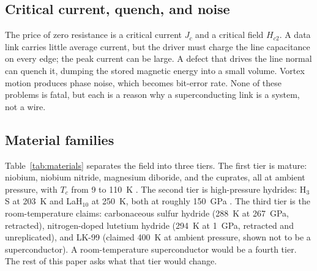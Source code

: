 \documentclass[10pt,letterpaper]{article}
\begin{document}
\subsection{Critical current, quench, and noise}

The price of zero resistance is a critical current $J_c$ and a critical field $H_{c2}$. A data link carries little average current, but the driver must charge the line capacitance on every edge; the peak current can be large. A defect that drives the line normal can quench it, dumping the stored magnetic energy into a small volume. Vortex motion produces phase noise, which becomes bit-error rate. None of these problems is fatal, but each is a reason why a superconducting link is a system, not a wire.

\subsection{Material families}

Table~\ref{tab:materials} separates the field into three tiers. The first tier is mature: niobium, niobium nitride, magnesium diboride, and the cuprates, all at ambient pressure, with $T_c$ from 9 to 110~K \cite{bednorz,wu}. The second tier is high-pressure hydrides: H$_3$S at 203~K and LaH$_{10}$ at 250~K, both at roughly 150~GPa \cite{drozdov2015,somayazulu,drozdov2019}. The third tier is the room-temperature claims: carbonaceous sulfur hydride (288~K at 267~GPa, retracted), nitrogen-doped lutetium hydride (294~K at 1~GPa, retracted and unreplicated), and LK-99 (claimed 400~K at ambient pressure, shown not to be a superconductor). A room-temperature superconductor would be a fourth tier. The rest of this paper asks what that tier would change.
\end{document}
